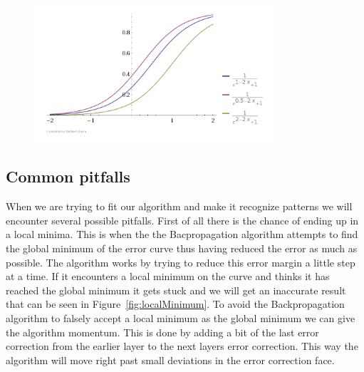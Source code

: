 \begin{figure}[!ht]
\centering
\includegraphics[width=0.8\textwidth ,natwidth=410,natheight=237]{billeder/ActivationFunctionsWithBias.png}
\caption{}
\label{fig:activationFunctionsWithBias}
\end{figure}

\subsection{Common pitfalls}
\label{sec:ANNCommonPitfalls}
When we are trying to fit our algorithm and make it recognize patterns we will encounter several possible pitfalls. First of all there is the chance of ending up in a local minima. This is when the the Bacpropagation algorithm attempts to find the global minimum of the error curve thus having reduced the error as much as possible. The algorithm works by trying to reduce this error margin a little step at a time. If it encounters a local minimum on the curve and thinks it has reached the global minimum it gets stuck and we will get an inaccurate result that can be seen in Figure~\ref{fig:localMinimum}. To avoid the Backpropagation algorithm to falsely accept a local minimum as the global minimum we can give the algorithm momentum. This is done by adding a bit of the last error correction from the earlier layer to the next layers error correction. This way the algorithm will move right past small deviations in the error correction face.

